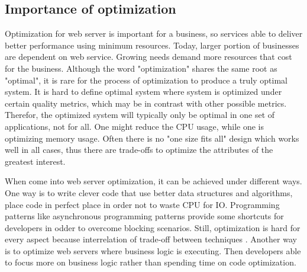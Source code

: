 \subsection{Importance of optimization} 

Optimization for web server is important for a business, so services able to deliver better performance using minimum resources. Today, larger portion of businesses are dependent on web service. Growing needs demand more resources that cost for the business. Although the word "optimization" shares the same root as "optimal", it is rare for the process of optimization to produce a truly optimal system. It is hard to define optimal system where system is optimized under certain quality metrics, which may be in contrast with other possible metrics. Therefor, the optimized system will typically only be optimal in one set of applications, not for all. One might reduce the CPU usage, while one is optimizing memory usage. Often there is no "one size fits all" design which works well in all cases, thus there are trade-offs to optimize the attributes of the greatest interest.

When come into web server optimization, it can be achieved under different ways. One way is to write clever code that use better data structures and algorithms, place code in perfect place in order not to waste CPU for IO. Programming patterns like asynchronous programming patterns provide some shortcuts for developers in odder to overcome blocking scenarios. Still, optimization is hard for every aspect because interrelation of trade-off between techniques \cite{wescott2013every,Adewumi+2018+115+122}.  Another way is to optimize web servers where business logic is executing. Then developers able to focus more on business logic rather than spending time on code optimization.




